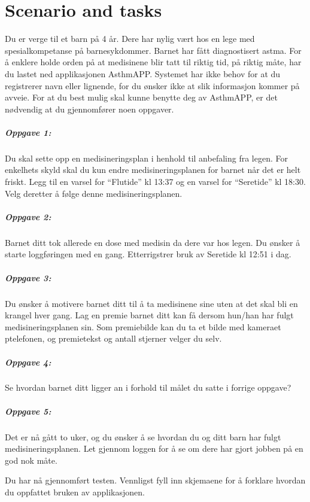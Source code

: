 \chapter{Scenario and tasks}
\label{app:scenarioandtasks}

Du er verge til et barn p\r{a}  4 \aa r. Dere har nylig v\ae rt hos en lege med spesialkompetanse p\r{a} barnesykdommer.
Barnet har f\r{a}tt diagnostisert astma. For \r{a} enklere holde orden p\r{a} at medisinene blir tatt til riktig tid, p\r{a} riktig m\r{a}te, 
har du lastet ned applikasjonen AsthmAPP. Systemet har ikke behov for at du registrerer navn eller lignende, 
for du \o nsker ikke at slik informasjon kommer p\r{a} avveie. For at du best mulig skal kunne benytte deg av AsthmAPP, er det
n\o dvendig at du gjennomf\o rer noen oppgaver.

\paragraph{Oppgave 1:}
Du skal sette opp en medisineringsplan i henhold til anbefaling fra legen. For enkelhets skyld skal du kun endre
medisineringsplanen for barnet n\r{a}r det er helt friskt. Legg til en varsel for ``Flutide'' kl 13:37 og en varsel for ``Seretide'' kl 18:30.
Velg deretter \r{a} f\o lge denne medisineringsplanen.


\paragraph{Oppgave 2:}
Barnet ditt tok allerede en dose med medisin da dere var hos legen. Du \o nsker \r{a} starte loggf\o ringen med en gang. Etterrigstrer bruk
av Seretide kl 12:51 i dag.


\paragraph{Oppgave 3:}
Du \o nsker \r{a} motivere barnet ditt til \r{a} ta medisinene sine uten at det skal bli en krangel hver gang.
Lag en premie barnet ditt kan f\r{a} dersom hun/han har fulgt medisineringsplanen sin.
Som premiebilde kan du ta et bilde med kameraet p\a telefonen, og premietekst og antall stjerner velger du selv.


\paragraph{Oppgave 4:}
Se hvordan barnet ditt ligger an i forhold til m\r{a}let du satte i forrige oppgave?


\paragraph{Oppgave 5:}
Det er n\r{a} g\r{a}tt to uker, og du \o nsker \r{a} se hvordan du og ditt barn har fulgt medisineringsplanen. 
Let gjennom loggen for \r{a} se om dere har gjort jobben p\r{a} en god nok m\r{a}te.



Du har n\r{a} gjennomf\o rt testen. Vennligst fyll inn skjemaene for \r{a} forklare hvordan du oppfattet bruken av applikasjonen.

